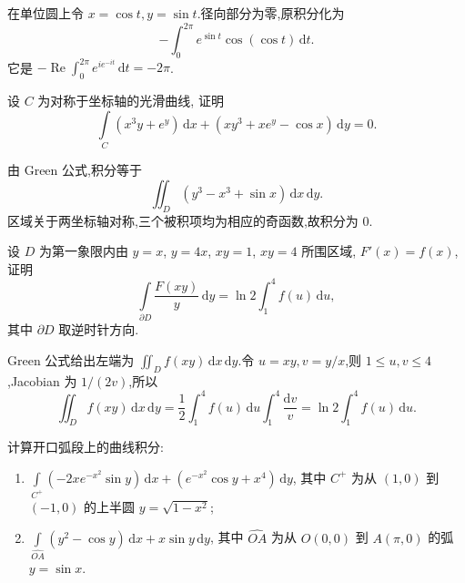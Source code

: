 \begin{solution}
    在单位圆上令 $x=\cos t,y=\sin t$.径向部分为零,原积分化为
    \[
        -\int_0^{2\pi}e^{\sin t}\cos(\cos t)\,\mathrm{d}t.
    \]
    它是 $-\operatorname{Re}\displaystyle\int_0^{2\pi}e^{i e^{-it}}\,\mathrm{d}t=-2\pi$.
\end{solution}

\begin{example}
    设 $C$ 为对称于坐标轴的光滑曲线, 证明
    \[
        \displaystyle\int\limits_C(x^3y+e^y)\,\mathrm{d}x+(xy^3+xe^y-\cos x)\,\mathrm{d}y=0.
    \]
\end{example}
\exampleblank

\begin{solution}
    由 Green 公式,积分等于
    \[
        \displaystyle\iint_D(y^3-x^3+\sin x)\,\mathrm{d}x\,\mathrm{d}y.
    \]
    区域关于两坐标轴对称,三个被积项均为相应的奇函数,故积分为 $0$.
\end{solution}

\begin{example}
    设 $D$ 为第一象限内由 $y=x$, $y=4x$, $xy=1$, $xy=4$ 所围区域, $F'(x)=f(x)$, 证明
    \[
        \displaystyle\int\limits_{\partial D}\dfrac{F(xy)}{y}\,\mathrm{d}y
        =\ln2\int_1^4f(u)\,\mathrm{d}u,
    \]
    其中 $\partial D$ 取逆时针方向.
\end{example}
\exampleblank

\begin{solution}
    Green 公式给出左端为 $\displaystyle\iint_Df(xy)\,\mathrm{d}x\,\mathrm{d}y$.令 $u=xy,v=y/x$,则 $1\leq u,v\leq4$,Jacobian 为 $1/(2v)$,所以
    \[
        \displaystyle\iint_Df(xy)\,\mathrm{d}x\,\mathrm{d}y
        =\dfrac{1}{2}\int_1^4f(u)\,\mathrm{d}u\int_1^4\dfrac{\mathrm{d}v}{v}
        =\ln2\int_1^4f(u)\,\mathrm{d}u.
    \]
\end{solution}

\begin{example}
    计算开口弧段上的曲线积分:
    \begin{enumerate}
        \item $\displaystyle\int\limits_{C^+}(-2xe^{-x^2}\sin y)\,\mathrm{d}x+(e^{-x^2}\cos y+x^4)\,\mathrm{d}y$, 其中 $C^+$ 为从 $(1,0)$ 到 $(-1,0)$ 的上半圆 $y=\sqrt{1-x^2}$;
        \item $\displaystyle\int\limits_{\widehat{OA}}(y^2-\cos y)\,\mathrm{d}x+x\sin y\,\mathrm{d}y$, 其中 $\widehat{OA}$ 为从 $O(0,0)$ 到 $A(\pi,0)$ 的弧 $y=\sin x$.
    \end{enumerate}
\end{example}
\exampleblank

